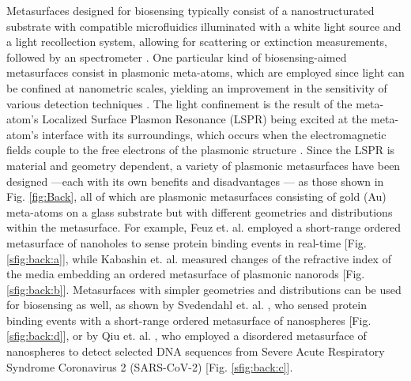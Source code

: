 Metasurfaces designed for biosensing typically consist of a nanostructurated substrate with compatible microfluidics illuminated with a white light source and a light recollection system, allowing for scattering or extinction measurements, followed by an spectrometer \cite{estevez_trends_2014,feuz_improving_2010}. One particular kind of  biosensing-aimed metasurfaces consist in plasmonic meta-atoms, which are employed since light can be confined at nanometric scales, yielding an improvement in the sensitivity of various detection techniques \cite{khan_optical_2022}. The light confinement is the result of the meta-atom's Localized Surface Plasmon Resonance (LSPR) being excited at the meta-atom's interface with its surroundings, which occurs when the electromagnetic fields couple to the free electrons of the plasmonic structure \cite{chen_review_2016,kim_plasmonic_2019,estevez_trends_2014}.  Since the LSPR is material and geometry dependent, a variety of plasmonic metasurfaces have been designed \cite{feuz_improving_2010,kabashin_plasmonic_2009,qiu_dual_2020,svedendahl_refractometric_2014} ---each with its own benefits and disadvantages \cite{chen_review_2016,estevez_trends_2014}--- as those shown in  Fig. \ref{fig:Back}, all of which are plasmonic metasurfaces consisting of gold (Au) meta-atoms on a glass substrate but with different geometries and distributions within the metasurface.  For example, Feuz et. al. \cite{feuz_improving_2010} employed a short-range ordered metasurface of nanoholes to sense protein binding events in real-time [Fig. \ref{sfig:back:a}], while  Kabashin et. al. \cite{kabashin_plasmonic_2009} measured  changes of the refractive index of the media embedding an ordered metasurface of plasmonic nanorods [Fig. \ref{sfig:back:b}].  Metasurfaces with simpler geometries and distributions can be used  for biosensing as well, as shown by Svedendahl et. al. \cite{svedendahl_refractometric_2014}, who sensed protein binding events with a short-range ordered metasurface of nanospheres [Fig. \ref{sfig:back:d}], or by  Qiu et. al. \cite{qiu_dual_2020}, who employed a disordered metasurface of nanospheres to detect selected DNA sequences from Severe Acute Respiratory Syndrome Coronavirus 2 (SARS-CoV-2) [Fig. \ref{sfig:back:c}].

